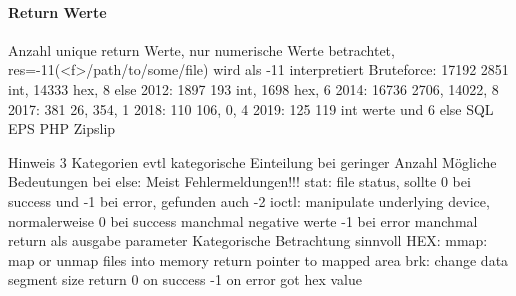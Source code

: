             \paragraph{Return Werte}
                Anzahl unique return Werte, nur numerische Werte betrachtet, 
                res=-11(<f>/path/to/some/file) wird als -11 interpretiert
                Bruteforce: 17192 2851 int, 14333 hex, 8 else
                2012:       1897 193 int, 1698 hex, 6
                2014:       16736 2706, 14022, 8
                2017:       381 26, 354, 1 
                2018:       110 106, 0, 4 
                2019:       125 119 int werte und 6 else
                SQL
                EPS
                PHP
                Zipslip

                Hinweis 3 Kategorien evtl kategorische Einteilung bei geringer Anzahl
                Mögliche Bedeutungen bei else:
                    Meist Fehlermeldungen!!!
                    stat:
                        file status, 
                        sollte 0 bei success und -1 bei error, gefunden auch -2 
                    ioctl:
                        manipulate underlying device, 
                        normalerweise 0 bei success manchmal negative werte
                        -1 bei error
                        manchmal return als ausgabe parameter
                    Kategorische Betrachtung sinnvoll
                HEX:\@
                    mmap:
                        map or unmap files into memory
                        return pointer to mapped area
                    brk:
                        change data segment size
                        return 0 on success -1 on error
                        got hex value

